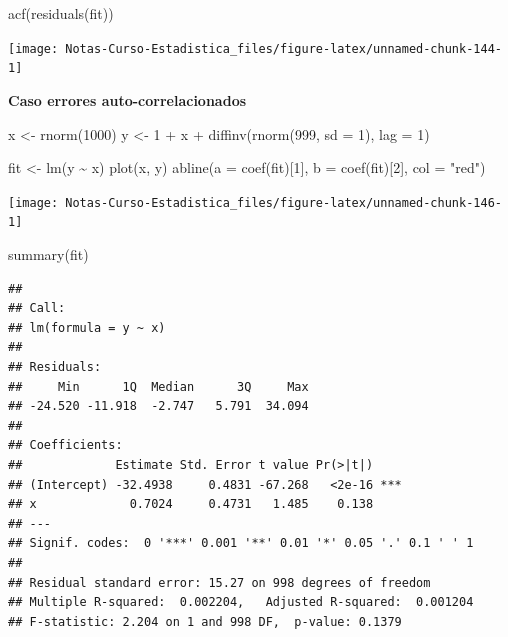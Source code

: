 \documentclass[
  12pt,
]{book}
\newenvironment{Shaded}{\begin{snugshade}}{\end{snugshade}}
\newcommand{\AttributeTok}[1]{\textcolor[rgb]{0.77,0.63,0.00}{#1}}
\newcommand{\DecValTok}[1]{\textcolor[rgb]{0.00,0.00,0.81}{#1}}
\newcommand{\FunctionTok}[1]{\textcolor[rgb]{0.00,0.00,0.00}{#1}}
\newcommand{\NormalTok}[1]{#1}
\newcommand{\OtherTok}[1]{\textcolor[rgb]{0.56,0.35,0.01}{#1}}
\newcommand{\SpecialCharTok}[1]{\textcolor[rgb]{0.00,0.00,0.00}{#1}}
\newcommand{\StringTok}[1]{\textcolor[rgb]{0.31,0.60,0.02}{#1}}
\theoremstyle{definition}
\theoremstyle{definition}
\theoremstyle{definition}
\theoremstyle{definition}
\theoremstyle{remark}
\begin{document}
\begin{Shaded}
\begin{Highlighting}[]
\FunctionTok{acf}\NormalTok{(}\FunctionTok{residuals}\NormalTok{(fit))}
\end{Highlighting}
\end{Shaded}

\begin{center}\texttt{[image: Notas-Curso-Estadistica\_files/figure-latex/unnamed-chunk-144-1]} \end{center}

\textbf{Caso errores auto-correlacionados}

\begin{Shaded}
\begin{Highlighting}[]
\NormalTok{x }\OtherTok{\textless{}{-}} \FunctionTok{rnorm}\NormalTok{(}\DecValTok{1000}\NormalTok{)}
\NormalTok{y }\OtherTok{\textless{}{-}} \DecValTok{1} \SpecialCharTok{+}\NormalTok{ x }\SpecialCharTok{+} \FunctionTok{diffinv}\NormalTok{(}\FunctionTok{rnorm}\NormalTok{(}\DecValTok{999}\NormalTok{, }\AttributeTok{sd =} \DecValTok{1}\NormalTok{), }\AttributeTok{lag =} \DecValTok{1}\NormalTok{)}
\end{Highlighting}
\end{Shaded}

\begin{Shaded}
\begin{Highlighting}[]
\NormalTok{fit }\OtherTok{\textless{}{-}} \FunctionTok{lm}\NormalTok{(y }\SpecialCharTok{\textasciitilde{}}\NormalTok{ x)}
\FunctionTok{plot}\NormalTok{(x, y)}
\FunctionTok{abline}\NormalTok{(}\AttributeTok{a =} \FunctionTok{coef}\NormalTok{(fit)[}\DecValTok{1}\NormalTok{], }\AttributeTok{b =} \FunctionTok{coef}\NormalTok{(fit)[}\DecValTok{2}\NormalTok{], }\AttributeTok{col =} \StringTok{"red"}\NormalTok{)}
\end{Highlighting}
\end{Shaded}

\begin{center}\texttt{[image: Notas-Curso-Estadistica\_files/figure-latex/unnamed-chunk-146-1]} \end{center}

\begin{Shaded}
\begin{Highlighting}[]
\FunctionTok{summary}\NormalTok{(fit)}
\end{Highlighting}
\end{Shaded}

\begin{verbatim}
## 
## Call:
## lm(formula = y ~ x)
## 
## Residuals:
##     Min      1Q  Median      3Q     Max 
## -24.520 -11.918  -2.747   5.791  34.094 
## 
## Coefficients:
##             Estimate Std. Error t value Pr(>|t|)    
## (Intercept) -32.4938     0.4831 -67.268   <2e-16 ***
## x             0.7024     0.4731   1.485    0.138    
## ---
## Signif. codes:  0 '***' 0.001 '**' 0.01 '*' 0.05 '.' 0.1 ' ' 1
## 
## Residual standard error: 15.27 on 998 degrees of freedom
## Multiple R-squared:  0.002204,   Adjusted R-squared:  0.001204 
## F-statistic: 2.204 on 1 and 998 DF,  p-value: 0.1379
\end{verbatim}
\end{document}
